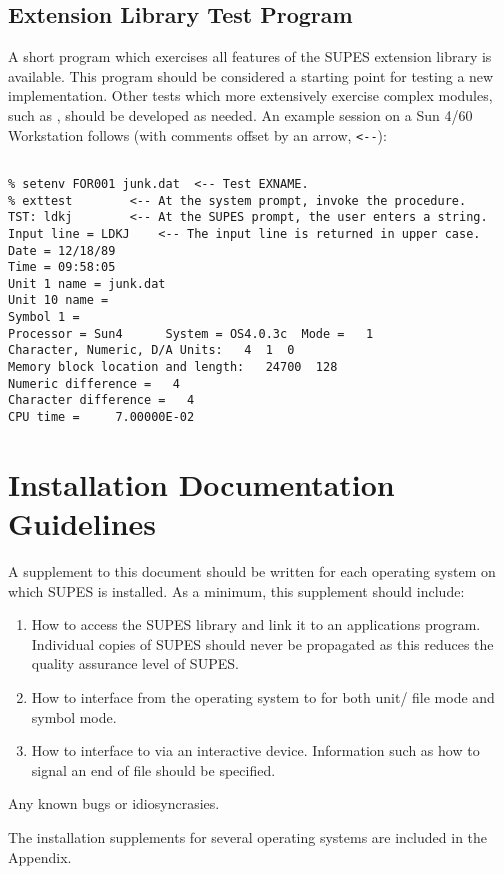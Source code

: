 \subsection{Extension Library Test Program}
A short program which exercises all features of the SUPES extension
library is available.  This program should be considered a starting point
for testing a new implementation.  Other tests which more extensively
exercise complex modules, such as , should be developed as needed.
An example session on a Sun 4/60 Workstation follows (with comments offset by
an arrow, \verb+<--+):
\begin{verbatim}

% setenv FOR001 junk.dat  <-- Test EXNAME.
% exttest        <-- At the system prompt, invoke the procedure.
TST: ldkj        <-- At the SUPES prompt, the user enters a string.
Input line = LDKJ    <-- The input line is returned in upper case.
Date = 12/18/89
Time = 09:58:05
Unit 1 name = junk.dat
Unit 10 name =
Symbol 1 =
Processor = Sun4      System = OS4.0.3c  Mode =   1
Character, Numeric, D/A Units:   4  1  0
Memory block location and length:   24700  128
Numeric difference =   4
Character difference =   4
CPU time =     7.00000E-02

\end{verbatim}

\section{Installation Documentation Guidelines}
A supplement to this document should be written for each operating system on
which SUPES is installed.  As a minimum, this supplement should include:
\begin{enumerate}
\item How to access the SUPES library and link it to an applications
        program.  Individual copies of SUPES should never be propagated as
        this reduces the quality assurance level of SUPES.

\item How to interface from the operating system to  for both unit/
        file mode and symbol mode.

\item How to interface to  via an interactive device.  Information
        such as how to signal an end of file should be specified.
\end{enumerate}

Any known bugs or idiosyncrasies.

The installation supplements for several operating systems are included in
the Appendix.
